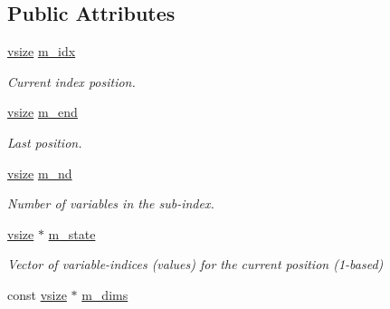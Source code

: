 \subsection*{Public Attributes}
\begin{DoxyCompactItemize}
\item 
\hypertarget{classmerlin_1_1subindex_ace8d4c5272d59793482b2cfaae5c84b4}{}\hyperlink{classmerlin_1_1subindex_a85a7fddb94bd83a77a4a73293c5d613a}{vsize} \hyperlink{classmerlin_1_1subindex_ace8d4c5272d59793482b2cfaae5c84b4}{m\+\_\+idx}\label{classmerlin_1_1subindex_ace8d4c5272d59793482b2cfaae5c84b4}

\begin{DoxyCompactList}\small\item\em Current index position. \end{DoxyCompactList}\item 
\hypertarget{classmerlin_1_1subindex_ae39e046222b12314a76e22b38a390eaa}{}\hyperlink{classmerlin_1_1subindex_a85a7fddb94bd83a77a4a73293c5d613a}{vsize} \hyperlink{classmerlin_1_1subindex_ae39e046222b12314a76e22b38a390eaa}{m\+\_\+end}\label{classmerlin_1_1subindex_ae39e046222b12314a76e22b38a390eaa}

\begin{DoxyCompactList}\small\item\em Last position. \end{DoxyCompactList}\item 
\hypertarget{classmerlin_1_1subindex_a2acf7a181ba7c7e4550303b45f655af3}{}\hyperlink{classmerlin_1_1subindex_a85a7fddb94bd83a77a4a73293c5d613a}{vsize} \hyperlink{classmerlin_1_1subindex_a2acf7a181ba7c7e4550303b45f655af3}{m\+\_\+nd}\label{classmerlin_1_1subindex_a2acf7a181ba7c7e4550303b45f655af3}

\begin{DoxyCompactList}\small\item\em Number of variables in the sub-\/index. \end{DoxyCompactList}\item 
\hypertarget{classmerlin_1_1subindex_acd8990d2aa72a0650ecb66a15274cc8f}{}\hyperlink{classmerlin_1_1subindex_a85a7fddb94bd83a77a4a73293c5d613a}{vsize} $\ast$ \hyperlink{classmerlin_1_1subindex_acd8990d2aa72a0650ecb66a15274cc8f}{m\+\_\+state}\label{classmerlin_1_1subindex_acd8990d2aa72a0650ecb66a15274cc8f}

\begin{DoxyCompactList}\small\item\em Vector of variable-\/indices (values) for the current position (1-\/based) \end{DoxyCompactList}\item 
\hypertarget{classmerlin_1_1subindex_ab61eacce232dc804e1c12bf9b0445c3a}{}const \hyperlink{classmerlin_1_1subindex_a85a7fddb94bd83a77a4a73293c5d613a}{vsize} $\ast$ \hyperlink{classmerlin_1_1subindex_ab61eacce232dc804e1c12bf9b0445c3a}{m\+\_\+dims}\label{classmerlin_1_1subindex_ab61eacce232dc804e1c12bf9b0445c3a}


\end{DoxyCompactItemize}
